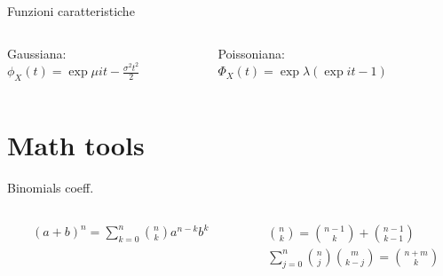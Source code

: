 \documentclass[asd-beamer.tex]{subfiles}
\begin{document}

\begin{wordonframe}{Funzioni caratteristiche}
\begin{columns}[T]
	\begin{column}{0.5\textwidth}
Gaussiana: $\phi_X(t)=\exp{\mu it-\frac{\sigma^2t^2}{2}}$
	\end{column}
	\begin{column}{0.5\textwidth}
Poissoniana: $\Phi_X(t)=\exp{\lambda(\exp{it}-1)}$
	\end{column}
\end{columns}
\end{wordonframe}

\section{Math tools}

\begin{wordonframe}{Binomials coeff.}\frameintoc
	\begin{columns}[T]
\begin{column}{0.5\textwidth}
\begin{align*}
&(a+b)^n=\sum_{k=0}^n\binom{n}{k}a^{n-k}b^k
\end{align*}
\end{column}
\begin{column}{0.5\textwidth}
\begin{align*}
&\binom{n}{k}=\binom{n-1}{k}+\binom{n-1}{k-1}\\
&\sum_{j=0}^n\binom{n}{j}\binom{m}{k-j}=\binom{n+m}{k}
\end{align*}
\end{column}
	\end{columns}
\end{wordonframe}
\end{document}
